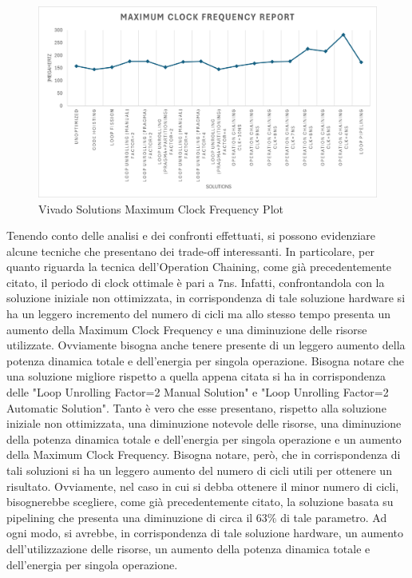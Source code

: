 \begin{figure}[H]
	\centering
	\includegraphics[width=0.7\textheight]{conclusions/frequency.png}
	\caption{Vivado Solutions Maximum Clock Frequency Plot}
	\label{fig:vivado-maximum-clock-frequency-plot}
\end{figure}

Tenendo conto delle analisi e dei confronti effettuati, si possono evidenziare alcune tecniche che presentano dei trade-off interessanti. In particolare, per quanto riguarda la tecnica dell'Operation Chaining, come già precedentemente citato, il periodo di clock ottimale è pari a 7ns. Infatti, confrontandola con la soluzione iniziale non ottimizzata, in corrispondenza di tale soluzione hardware si ha un leggero incremento del numero di cicli ma allo stesso tempo presenta un aumento della Maximum Clock Frequency e una diminuzione delle risorse utilizzate. Ovviamente bisogna anche tenere presente di un leggero aumento della potenza dinamica totale e dell'energia per singola operazione. Bisogna notare che una soluzione migliore rispetto a quella appena citata si ha in corrispondenza delle "Loop Unrolling Factor=2 Manual Solution" e "Loop Unrolling Factor=2 Automatic Solution". Tanto è vero che esse presentano, rispetto alla soluzione iniziale non ottimizzata, una diminuzione notevole delle risorse, una diminuzione della potenza dinamica totale e dell'energia per singola operazione e un aumento della Maximum Clock Frequency. Bisogna notare, però, che in corrispondenza di tali soluzioni si ha un leggero aumento del numero di cicli utili per ottenere un risultato. Ovviamente, nel caso in cui si debba ottenere il minor numero di cicli, bisognerebbe scegliere, come già precedentemente citato, la soluzione basata su pipelining che presenta una diminuzione di circa il $63\%$ di tale parametro. Ad ogni modo, si avrebbe, in corrispondenza di tale soluzione hardware, un aumento dell'utilizzazione delle risorse, un aumento della potenza dinamica totale e dell'energia per singola operazione.